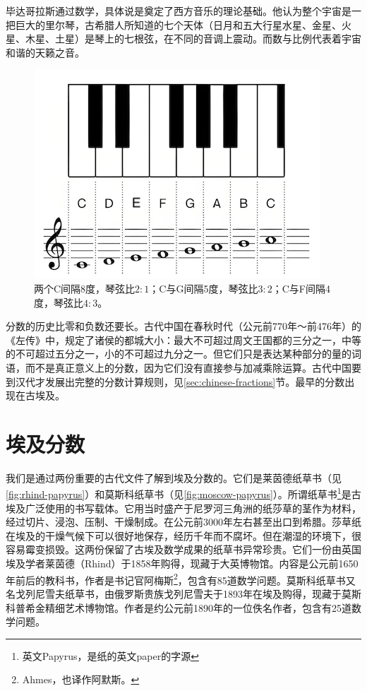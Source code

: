 \documentclass[b5paper]{ctexart}
\begin{document}
毕达哥拉斯通过数学，具体说是奠定了西方音乐的理论基础。他认为整个宇宙是一把巨大的里尔琴，古希腊人所知道的七个天体（日月和五大行星水星、金星、火星、木星、土星）是琴上的七根弦，在不同的音调上震动。而数与比例代表着宇宙和谐的天籁之音。

\begin{figure}[htbp]
 \centering
 \includegraphics[scale=0.4]{img/octave}
 \caption{两个C间隔8度，琴弦比$2:1$；C与G间隔5度，琴弦比$3:2$；C与F间隔4度，琴弦比$4:3$。}
 \label{fig:octave}
\end{figure}

分数的历史比零和负数还要长。古代中国在春秋时代（公元前770年～前476年）的《左传》中，规定了诸侯的都城大小：最大不可超过周文王国都的三分之一，中等的不可超过五分之一，小的不可超过九分之一。但它们只是表达某种部分的量的词语，而不是真正意义上的分数，因为它们没有直接参与加减乘除运算。古代中国要到汉代才发展出完整的分数计算规则，见\ref{sec:chinese-fractions}节。最早的分数出现在古埃及。

\section{埃及分数}
我们是通过两份重要的古代文件了解到埃及分数的。它们是莱茵德纸草书（见\cref{fig:rhind-papyrus}）和莫斯科纸草书（见\cref{fig:moscow-papyrus}）。所谓纸草书\footnote{英文Papyrus，是纸的英文paper的字源}是古埃及广泛使用的书写载体。它用当时盛产于尼罗河三角洲的纸莎草的茎作为材料，经过切片、浸泡、压制、干燥制成。在公元前3000年左右甚至出口到希腊。莎草纸在埃及的干燥气候下可以很好地保存，经历千年而不腐坏。但在潮湿的环境下，很容易霉变损毁。这两份保留了古埃及数学成果的纸草书异常珍贵。它们一份由英国埃及学者莱茵德（Rhind）于1858年购得，现藏于大英博物馆。内容是公元前1650年前后的教科书，作者是书记官阿梅斯\footnote{Ahmes，也译作阿默斯。}，包含有85道数学问题。莫斯科纸草书又名戈列尼雪夫纸草书，由俄罗斯贵族戈列尼雪夫于1893年在埃及购得，现藏于莫斯科普希金精细艺术博物馆。作者是约公元前1890年的一位佚名作者，包含有25道数学问题。
\end{document}
